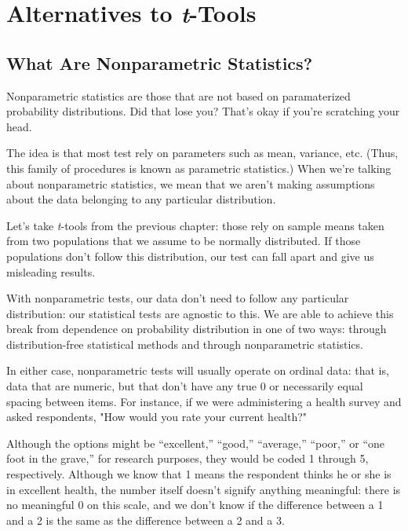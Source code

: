 
\chapter{Alternatives to \textit{t}-Tools}

\section{What Are Nonparametric Statistics?}

Nonparametric statistics  are those that are not based on paramaterized probability distributions. Did that lose you? That's okay if you're scratching your head.

The idea is that most test rely on parameters such as mean, variance, etc. (Thus, this family of procedures is known as parametric statistics.) When we're talking about nonparametric statistics, we mean that we aren't making assumptions about the data belonging to any particular distribution.

Let's take \textit{t}-tools from the previous chapter: those rely on sample means taken from two populations that we assume to be normally distributed. If those populations don't follow this distribution, our test can fall apart and give us misleading results.

With nonparametric tests, our data don't need to follow any particular distribution: our statistical tests are agnostic to this. We are able to achieve this break from dependence on probability distribution in one of two ways: through distribution-free statistical methods and through nonparametric statistics.

In either case, nonparametric tests will usually operate on ordinal data: that is, data that are numeric, but that don't have any true 0 or necessarily equal spacing between items. For instance, if we were administering a health survey and asked respondents, "How would you rate your current health?"

Although the options might be ``excellent,'' ``good,'' ``average,'' ``poor,'' or ``one foot in the grave,'' for research purposes, they would be coded 1 through 5, respectively. Although we know that 1 means the respondent thinks he or she is in excellent health, the number itself doesn't signify anything meaningful: there is no meaningful 0 on this scale, and we don't know if the difference between a 1 and a 2 is the same as the difference between a 2 and a 3.

